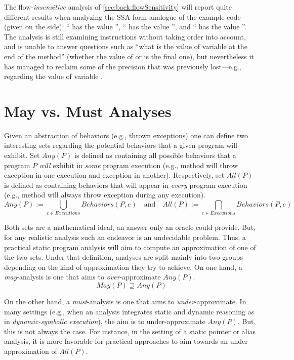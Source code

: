 The flow-\emph{insensitive} analysis of \ref{sec:back:flowSensitivity} will report quite different results when analyzing the SSA-form analogue of the example code (given on the side): `` has the value '', `` has the value '', and `` has the value ''. The analysis is still examining instructions without taking order into account, and is unable to answer questions such as ``what is the value of variable  at the end of the method'' (whether the value of  or  is the final one), but nevertheless it has managed to reclaim some of the precision that was previously lost---e.g., regarding the value of variable .



\section{May vs. Must Analyses}
\label{sec:back:may-must}

Given an abstraction of behaviors (e.g., thrown exceptions) one can define two interesting sets regarding the potential behaviors that a given program will exhibit. Set $Any(P)$ is defined as containing all possible behaviors that a program $P$ \emph{will} exhibit in \emph{some} program execution (e.g., method  will throw exception  in one execution and exception  in another). Respectively, set $All(P)$ is defined as containing behaviors that will appear in \emph{every} program execution (e.g., method  will always throw exception  during any execution).
\[
Any(P) := \bigcup_{e \in Executions} Behaviors(P, e)
\quad \textrm{and} \quad
All(P) := \bigcap_{e \in Executions} Behaviors(P, e)
\]

Both sets are a mathematical ideal, an answer only an oracle could provide. But, for any realistic analysis such an endeavor is an undecidable problem. Thus, a practical static program analysis will aim to compute an approximation of one of the two sets. Under that definition, analyses are split mainly into two groups depending on the kind of approximation they try to achieve.
On one hand, a \emph{may}-analysis is one that aims to \emph{over}-approximate $Any(P)$.
\[
May(P) \supseteq Any(P)
\]

On the other hand, a \emph{must}-analysis is one that aims to \emph{under}-approximate. In many settings (e.g., when an analysis integrates static and dynamic reasoning as in \emph{dynamic-symbolic execution}), the aim is to under-approximate $Any(P)$. But, this is not always the case. For instance, in the setting of a static pointer or alias analysis, it is more favorable for practical approaches to aim towards an under-approximation of $All(P)$.

